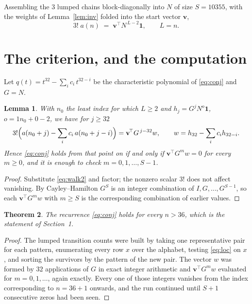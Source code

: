 \documentclass[11pt,a4paper]{article}
\theoremstyle{plain}
\newtheorem{theorem}{Theorem}
\newtheorem{lemma}[theorem]{Lemma}
\theoremstyle{definition}
\begin{document}
Assembling the $3$ lumped chains block-diagonally into $N$ of size $S=10355$, with the
weights of Lemma~\ref{lem:inv} folded into the start vector $\mathbf{v}$,
\begin{equation}\label{eq:walk2}
3!\;a(n)\;=\;\mathbf{v}^{\!\top}N^{\,L-2}\mathbf{1},\qquad L=n .
\end{equation}

\section{The criterion, and the computation}

Let $q(t)=t^{32}-\sum_i c_i\,t^{32-i}$ be the characteristic polynomial of
\eqref{eq:conj} and $G=N$.

\begin{lemma}\label{lem:crit}
With $n_0$ the least index for which $L\ge2$ and $h_j=G^{j}N^{o}\mathbf{1}$,
$o=1n_0+0-2$, we have for $j\ge32$
\[
3!\Bigl(a(n_0+j)-\sum_i c_i\,a(n_0+j-i)\Bigr)
=\mathbf{v}^{\!\top}G^{\,j-32}w,\qquad
w=h_{32}-\sum_i c_i h_{32-i} .
\]
Hence \eqref{eq:conj} holds from that point on if and only if
$\mathbf{v}^{\!\top}G^{m}w=0$ for every $m\ge0$, and it is enough to check
$m=0,1,\dots,S-1$.
\end{lemma}

\begin{proof}
Substitute \eqref{eq:walk2} and factor; the nonzero scalar $3!$ does not affect
vanishing. By Cayley--Hamilton $G^{S}$ is an integer combination of $I,G,\dots,G^{S-1}$,
so each $\mathbf{v}^{\!\top}G^{m}w$ with $m\ge S$ is the corresponding combination of
earlier values.
\end{proof}

\begin{theorem}
The recurrence \eqref{eq:conj} holds for every $n>36$, which is the statement of
Section~1.
\end{theorem}

\begin{proof}
The lumped transition counts were built by taking one representative pair for each pattern,
enumerating every row $x$ over the alphabet, testing \eqref{eq:loc} on $x$, and sorting
the survivors by the pattern of the new pair. The vector $w$ was formed by $32$
applications of $G$ in exact integer arithmetic and $\mathbf{v}^{\!\top}G^{m}w$
evaluated for $m=0,1,\dots$, again exactly. Every one of those integers vanishes from the
index corresponding to $n=36+1$ onwards, and the run continued until $S+1$ consecutive
zeros had been seen.
\end{proof}
\end{document}
